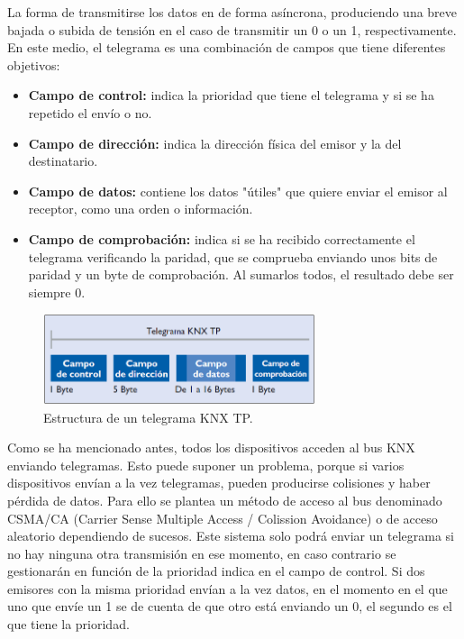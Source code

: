\begin{itemize}
    La forma de transmitirse los datos en de forma asíncrona, produciendo una breve bajada o subida de tensión en el caso de transmitir un 0 o un 1, respectivamente. En este medio, el telegrama es una combinación de campos que tiene diferentes objetivos:
    \begin{itemize}
        \item \textbf{Campo de control:} indica la prioridad que tiene el telegrama y si se ha repetido el envío o no.
        \item \textbf{Campo de dirección:} indica la dirección física del emisor y la del destinatario.
        \item \textbf{Campo de datos:} contiene los datos "útiles" que quiere enviar el emisor al receptor, como una orden o información.
        \item \textbf{Campo de comprobación:} indica si se ha recibido correctamente el telegrama verificando la paridad, que se comprueba enviando unos bits de paridad y un byte de comprobación. Al sumarlos todos, el resultado debe ser siempre 0.
    \end{itemize}
    \begin{figure}[h]
        \centering
        \includegraphics[width=8cm]{imagenes/capitulo2/Estructura de un telegrama KNX TP.png}
        \caption{Estructura de un telegrama KNX TP.}
        \label{fig:telegrama_KNX_TP}
    \end{figure}
    Como se ha mencionado antes, todos los dispositivos acceden al bus KNX enviando telegramas. Esto puede suponer un problema, porque si varios dispositivos envían a la vez telegramas, pueden producirse colisiones y haber pérdida de datos. Para ello se plantea un método de acceso al bus denominado CSMA/CA (Carrier Sense Multiple Access / Colission Avoidance) o de acceso aleatorio dependiendo de sucesos. Este sistema solo podrá enviar un telegrama si no hay ninguna otra transmisión en ese momento, en caso contrario se gestionarán en función de la prioridad indica en el campo de control. Si dos emisores con la misma prioridad envían a la vez datos, en el momento en el que uno que envíe un 1 se de cuenta de que otro está enviando un 0, el segundo es el que tiene la prioridad.
    

\end{itemize}
